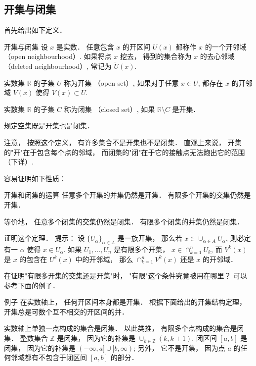 

\subsection{开集与闭集}

首先给出如下定义．

\begin{definition}{开集与闭集}
设 $x$ 是实数． 任意包含 $x$ 的开区间 $U(x)$ 都称作 $x$ 的一个开邻域 （open neighbourhood）. 如果将点 $x$ 挖去， 得到的集合称为 $x$ 的去心邻域 （deleted neighbourhood）, 常记为 $\mathring U(x)$.

实数集 $\mathbb{R}$ 的子集 $U$ 称为开集 （open set）, 如果对于任意 $x\in U$, 都存在 $x$ 的开邻域 $V(x)$ 使得 $V(x)\subset U$. 

实数集 $\mathbb{R}$ 的子集 $C$ 称为闭集 （closed set）, 如果 $\mathbb{R}\setminus C$ 是开集．

规定空集既是开集也是闭集．
\end{definition}

注意， 按照这个定义， 有许多集合不是开集也不是闭集． 直观上来说， 开集的"开"在于包含每个点的邻域， 而闭集的"闭"在于它的接触点无法跑出它的范围 （下详）.

容易证明如下性质：

\begin{theorem}{开集和闭集的运算}
任意多个开集的并集仍然是开集． 有限多个开集的交集仍然是开集．

等价地， 任意多个闭集的交集仍然是闭集． 有限多个闭集的并集仍然是闭集．
\end{theorem}

\begin{exercise}{}
证明这个定理． 提示： 设 $\{U_\alpha\}_{\alpha\in A}$ 是一族开集， 那么若 $x\in \cup_{\alpha\in A}U_\alpha$, 则必定有一 $\alpha$ 使得 $x\in U_\alpha$. 如果 $U_1,...,U_n$ 是有限多个开集， $x\in\cap_{k=1}^nU_k$, 而 $V^k(x)$ 是 $x$ 的包含在 $U^k(x)$ 中的开邻域， 那么 $\cap_{k=1}^nV^k(x)$ 还是 $x$ 的开邻域．
\end{exercise}

\begin{exercise}{}
在证明"有限多开集的交集还是开集"时， "有限"这个条件究竟被用在哪里？ 可以参考下面的例子．
\end{exercise}

\begin{example}{例子}
在实数轴上， 任何开区间本身都是开集． 根据下面给出的开集结构定理， 开集总是可数个互不相交的开区间的并．

实数轴上单独一点构成的集合是闭集． 以此类推， 有限多个点构成的集合是闭集． 整数集合 $\mathbb{Z}$ 是闭集， 因为它的补集是 $\cup_{k\in\mathbb{Z}}(k,k+1)$. 闭区间 $[a,b]$ 是闭集， 因为它的补集是 $(-\infty,a]\cup[b,\infty)$; 另外， 它不是开集， 因为点 $a$ 的任何邻域都有不包含于闭区间 $[a,b]$ 的部分．
\end{example}

